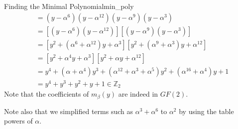 \begin{Example}{Finding the Minimal Polynomial}{min_poly}
\begin{align*}
         & =(y-\alpha^{6})(y-\alpha^{12})(y-\alpha^{9})(y-\alpha^3)                                 \\
         & =[(y-\alpha^{6})(y-\alpha^{12})][(y-\alpha^{9})(y-\alpha^3)]                             \\
         & =[y^2+(\alpha^6+\alpha^{12})y+\alpha^3][y^2+(\alpha^9+\alpha^3)y+\alpha^{12}]            \\
         & =[y^2+\alpha^4 y+\alpha^3][y^2+\alpha y+\alpha^{12}]                                     \\
         & =y^4+(\alpha+\alpha^4)y^3+(\alpha^{12}+\alpha^3+\alpha^5)y^2+(\alpha^{16}+\alpha^{4})y+1 \\
         & =y^4+y^3+y^2+y+1\in \mathbb{Z}_2
    \end{align*}
    Note that the coefficients of $ m_\beta(y) $ are indeed in $ GF(2) $.

    Note also that we simplified terms such as $ \alpha^3+\alpha^6 $ to $ \alpha^2 $
    by using the table powers of $ \alpha $.
\end{Example}

